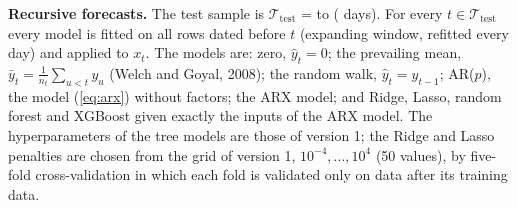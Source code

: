 \documentclass[11pt,a4paper]{article}
\begin{document}
\textbf{Recursive forecasts.} The test sample is $\mathcal T_{\mathrm{test}}$ = \TestFirst{} to \TestLast{}
(\TestDays{} days). For every $t \in \mathcal T_{\mathrm{test}}$ every model is fitted on all rows dated before $t$ (expanding
window, refitted every day) and applied to $x_t$. The models are: zero, $\hat y_t = 0$; the prevailing mean,
$\bar y_t = \frac{1}{n_t}\sum_{u<t} y_u$ (Welch and Goyal, 2008); the random walk, $\hat y_t = y_{t-1}$; AR($p$), the model
(\ref{eq:arx}) without factors; the ARX model; and Ridge, Lasso, random forest and XGBoost given exactly the inputs of the ARX
model. The hyperparameters of the tree models are those of version 1; the Ridge and Lasso penalties are chosen from the grid of
version 1, $10^{-4}, \dots, 10^{4}$ (50 values), by five-fold cross-validation in which each fold is validated only on data after
its training data.
\end{document}
